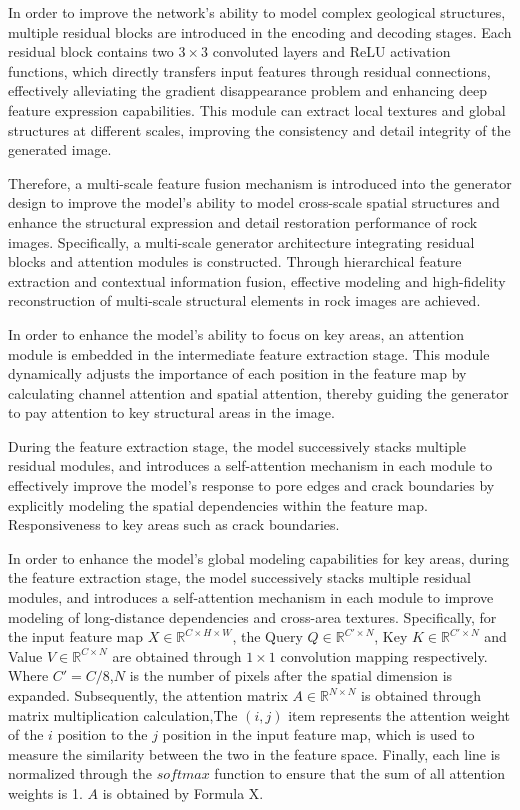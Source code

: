 \documentclass[a4paper,fleqn]{cas-sc}
\begin{document}
In order to improve the network's ability to model complex geological structures, multiple residual blocks are introduced in the encoding and decoding stages. Each residual block contains two $3\times3$ convoluted layers and ReLU activation functions, which directly transfers input features through residual connections, effectively alleviating the gradient disappearance problem and enhancing deep feature expression capabilities. This module can extract local textures and global structures at different scales, improving the consistency and detail integrity of the generated image.

Therefore, a multi-scale feature fusion mechanism is introduced into the generator design to improve the model's ability to model cross-scale spatial structures and enhance the structural expression and detail restoration performance of rock images. Specifically, a multi-scale generator architecture integrating residual blocks and attention modules is constructed. Through hierarchical feature extraction and contextual information fusion, effective modeling and high-fidelity reconstruction of multi-scale structural elements in rock images are achieved.



In order to enhance the model's ability to focus on key areas, an attention module is embedded in the intermediate feature extraction stage. This module dynamically adjusts the importance of each position in the feature map by calculating channel attention and spatial attention, thereby guiding the generator to pay attention to key structural areas in the image. 


During the feature extraction stage, the model successively stacks multiple residual modules, and introduces a self-attention mechanism in each module to effectively improve the model's response to pore edges and crack boundaries by explicitly modeling the spatial dependencies within the feature map. Responsiveness to key areas such as crack boundaries. 

In order to enhance the model's global modeling capabilities for key areas, during the feature extraction stage, the model successively stacks multiple residual modules, and introduces a self-attention mechanism in each module to improve modeling of long-distance dependencies and cross-area textures. Specifically, for the input feature map $X \in \mathbb{R}^{C \times H \times W}$, the Query $Q \in \mathbb{R}^{C' \times N}$, Key $K \in \mathbb{R}^{C' \times N}$ and Value $V \in \mathbb{R}^{C \times N}$ are obtained through $1\times1$ convolution mapping respectively. Where $C'=C/8$,$N$ is the number of pixels after the spatial dimension is expanded. Subsequently, the attention matrix $A \in \mathbb{R}^{N \times N}$ is obtained through matrix multiplication calculation,The $(i, j)$ item represents the attention weight of the $i$ position to the $j$ position in the input feature map, which is used to measure the similarity between the two in the feature space. Finally, each line is normalized through the $softmax$ function to ensure that the sum of all attention weights is 1. $A$ is obtained by Formula X. 
\end{document}
